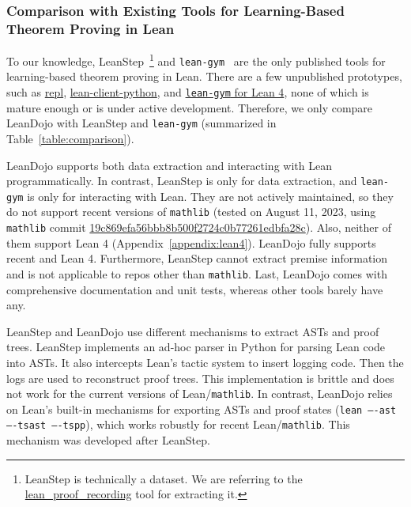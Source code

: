 \subsubsection{Comparison with Existing Tools for Learning-Based Theorem Proving in Lean}
\label{appendix:tool_comparison}

To our knowledge, LeanStep~\cite{han2022proof}\footnote{LeanStep is technically a dataset. We are referring to the \href{https://github.com/jasonrute/lean_proof_recording}{lean\_proof\_recording} tool for extracting it.} and \texttt{lean-gym}~\cite{polu2023formal} are the only published tools for learning-based theorem proving in Lean. There are a few unpublished prototypes, such as \href{https://github.com/leanprover-community/repl}{repl}, \href{https://github.com/leanprover-community/lean-client-python}{lean-client-python}, and \href{https://github.com/dselsam/lean-gym}{\texttt{lean-gym} for Lean 4}, none of which is mature enough or is under active development. Therefore, we only compare LeanDojo with LeanStep and \texttt{lean-gym} (summarized in Table~\ref{table:comparison}).

LeanDojo supports both data extraction and interacting with Lean programmatically. In contrast, LeanStep is only for data extraction, and \texttt{lean-gym} is only for interacting with Lean. They are not actively maintained, so they do not support recent versions of \texttt{mathlib} (tested on August 11, 2023, using \texttt{mathlib} commit \href{https://github.com/leanprover-community/mathlib/tree/19c869efa56bbb8b500f2724c0b77261edbfa28c}{19c869efa56bbb8b500f2724c0b77261edbfa28c}). Also, neither of them support Lean 4 (Appendix~\ref{appendix:lean4}). LeanDojo fully supports recent  and Lean 4. Furthermore, LeanStep cannot extract premise information and is not applicable to repos other than \texttt{mathlib}. Last, LeanDojo comes with comprehensive documentation and unit tests, whereas other tools barely have any.

LeanStep and LeanDojo use different mechanisms to extract ASTs and proof trees. LeanStep implements an ad-hoc parser in Python for parsing Lean code into ASTs. It also intercepts Lean's tactic system to insert logging code. Then the logs are used to reconstruct proof trees. This implementation is brittle and does not work for the current versions of Lean/\texttt{mathlib}. In contrast, LeanDojo relies on Lean’s built-in mechanisms for exporting ASTs and proof states (\texttt{lean ----ast ----tsast ----tspp}), which works robustly for recent Lean/\texttt{mathlib}. This mechanism was developed after LeanStep.

